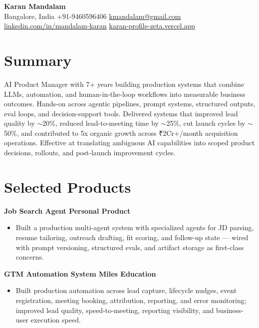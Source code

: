 \documentclass[10pt,a4paper]{article}
\begin{document}
\fontsize{9.5pt}{11pt}\selectfont

\begin{center}
{\LARGE \textbf{Karan Mandalam}} \\[4pt]
Bangalore, India \textbar{} +91-9460596406 \textbar{} \href{mailto:kmandalam@gmail.com}{kmandalam@gmail.com} \\
\href{https://linkedin.com/in/mandalam-karan}{linkedin.com/in/mandalam-karan} \textbar{} \href{https://karan-profile-zeta.vercel.app}{karan-profile-zeta.vercel.app}
\end{center}

\section*{Summary}
AI Product Manager with 7+ years building production systems that combine LLMs, automation, and human-in-the-loop workflows into measurable business outcomes. Hands-on across agentic pipelines, prompt systems, structured outputs, eval loops, and decision-support tools. Delivered systems that improved lead quality by $\sim$20\%, reduced lead-to-meeting time by $\sim$25\%, cut launch cycles by $\sim$50\%, and contributed to 5x organic growth across ₹2Cr+/month acquisition operations. Effective at translating ambiguous AI capabilities into scoped product decisions, rollouts, and post-launch improvement cycles.

\section*{Selected Products}

\textbf{Job Search Agent \textbar{} Personal Product}
\begin{itemize}
  \item Built a production multi-agent system with specialized agents for JD parsing, resume tailoring, outreach drafting, fit scoring, and follow-up state — wired with prompt versioning, structured evals, and artifact storage as first-class concerns.
\end{itemize}

\textbf{GTM Automation System \textbar{} Miles Education}
\begin{itemize}
  \item Built production automation across lead capture, lifecycle nudges, event registration, meeting booking, attribution, reporting, and error monitoring; improved lead quality, speed-to-meeting, reporting visibility, and business-user execution speed.
\end{itemize}
\end{document}
